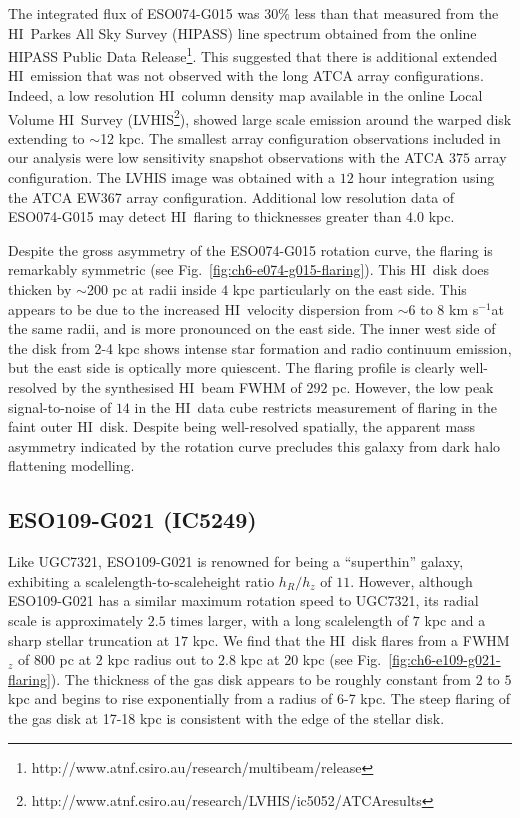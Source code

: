 \documentclass[traditabstract]{aa} %
\newcommand\HI{H{\small I}}
\newcommand\kms{km s$^{-1}$}
\begin{document}
The integrated flux of ESO074-G015 was $30\%$ less than that measured
from the \HI\ Parkes All Sky Survey (HIPASS) line spectrum obtained
from the online HIPASS Public Data 
Release\footnote{http://www.atnf.csiro.au/research/multibeam/release}. 
This suggested that there is additional extended \HI\ emission that was not
observed with the long ATCA array configurations. Indeed, a low resolution \HI\ column density
map available in the online Local Volume \HI\ Survey
(LVHIS\footnote{http://www.atnf.csiro.au/research/LVHIS/ic5052/ATCAresults}),
showed large scale emission around the warped disk extending to $\sim$12
kpc.  The smallest array configuration observations included in our
analysis were low sensitivity snapshot observations with the ATCA $375$
array configuration. The LVHIS image was
obtained with a $12$ hour integration using the ATCA EW367 array
configuration. Additional low resolution data of ESO074-G015 may detect \HI\ flaring 
to thicknesses greater than $4.0$ kpc.

Despite the gross asymmetry of the ESO074-G015 rotation curve, the flaring is
remarkably symmetric (see Fig.~\ref{fig:ch6-e074-g015-flaring}).
This \HI\ disk does thicken by $\sim$200 pc at radii inside $4$ kpc
particularly on the east side. This appears to be due to the
increased \HI\ velocity dispersion from $\sim$6 to 8 \kms at the same radii, 
and is more pronounced on the east side.
The inner west side of the disk from 2-4 kpc shows intense star
formation and radio continuum emission, but the east side is
optically more quiescent. The flaring profile is clearly
well-resolved by the synthesised \HI\ beam FWHM of $292$ pc. However,
the low peak signal-to-noise of $14$ in the \HI\ data cube restricts measurement of 
flaring in the faint outer \HI\ disk.
Despite being well-resolved spatially, the apparent mass asymmetry
indicated by the rotation curve precludes this galaxy from dark halo
flattening modelling.


\subsection{ESO109-G021 (IC5249)}

Like UGC7321, ESO109-G021 is renowned for being a ``superthin''
galaxy, exhibiting a scalelength-to-scaleheight ratio $h_R/h_z$ of $11$.
However, although ESO109-G021 has a similar maximum rotation speed to
UGC7321, its radial scale is approximately $2.5$ times larger, with a
long scalelength of $7$ kpc and a sharp stellar truncation at $17$
kpc. We find that the \HI\ disk flares from a FWHM$_z$ of $800$ pc at
$2$ kpc radius out to $2.8$ kpc at $20$ kpc (see
Fig.~\ref{fig:ch6-e109-g021-flaring}). The thickness of the gas disk
appears to be roughly constant from $2$ to $5$ kpc and begins to rise
exponentially from a radius of 6-7 kpc.  The steep flaring of the
gas disk at 17-18 kpc is consistent with the edge of the stellar
disk.
\end{document}
